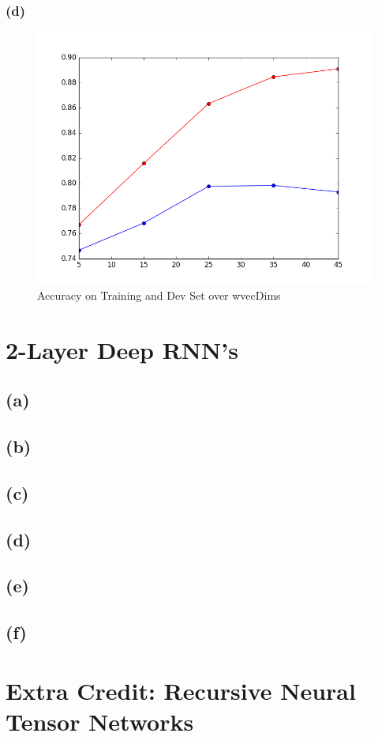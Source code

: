 \documentclass {article}
\begin{document}
\subsubsection*{(d)}
\begin{figure}[H]
\centering
\includegraphics[width=0.7\linewidth]{ps3_1_c_d}
\caption{Accuracy on Training and Dev Set over wvecDims}
\label{fig:ps3_1_c_d}
\end{figure}
\newpage

\section{2-Layer Deep RNN's}
\subsection*{(a)}
\subsection*{(b)}
\subsection*{(c)}
\subsection*{(d)}
\subsection*{(e)}
\subsection*{(f)}

\section{Extra Credit: Recursive Neural Tensor Networks}
\end{document}
